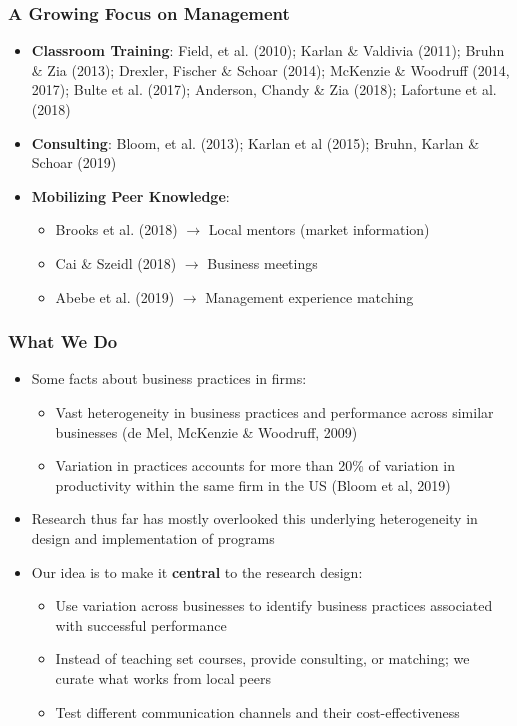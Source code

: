 \documentclass[10pt]{beamer}
\begin{document}
\begin{frame}
\frametitle{A Growing Focus on Management}
\begin{itemize}
\item \textbf{Classroom Training}: Field, et al. (2010); Karlan \& Valdivia (2011); Bruhn \& Zia (2013); Drexler, Fischer \& Schoar (2014); McKenzie \& Woodruff (2014, 2017); Bulte et al. (2017); Anderson, Chandy \& Zia (2018); Lafortune et al. (2018)
\vspace{0.2in}
\item \textbf{Consulting}: Bloom, et al. (2013); Karlan et al (2015); Bruhn, Karlan \& Schoar (2019)
\vspace{0.2in}

\item \textbf{Mobilizing Peer Knowledge}:
    \begin{itemize}
    \item Brooks et al. (2018) $\rightarrow$ Local mentors (market information)
    \item Cai \& Szeidl (2018) $\rightarrow$ Business meetings
    \item Abebe et al. (2019) $\rightarrow$ Management experience matching
    \end{itemize}
    \vspace{0.2in}
\end{itemize}
\end{frame}


\begin{frame}
\frametitle{What We Do}
\begin{itemize}
\item Some facts about business practices in firms:
	\begin{itemize}	
	\item Vast heterogeneity in business practices and performance across similar businesses (de Mel, McKenzie \& Woodruff, 2009)
	\item Variation in practices accounts for more than 20\% of variation in productivity within the same firm in the US (Bloom et al, 2019)
	\end{itemize}
\vspace{0.2in}
\pause
\item Research thus far has mostly overlooked this underlying heterogeneity in design and implementation of programs
\vspace{0.2in}
\pause
\item Our idea is to make it \textbf{central} to the research design: 
	\begin{itemize}
	\item Use variation across businesses to identify business practices associated with successful performance
	\item Instead of teaching set courses, provide consulting, or matching; we curate what works from local peers
	\item Test different communication channels and their cost-effectiveness
\end{itemize}
\end{itemize}

\end{frame}
\end{document}

